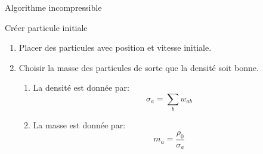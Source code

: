  \begin{frame}[<*>][shrink]{Algorithme incompressible}
\begin{block}{Créer particule initiale}
	\begin{enumerate}
		\item Placer des particules avec position et vitesse initiale.
		\item Choisir la masse des particules de sorte que la densité soit bonne.
		\begin{enumerate}
			\item La densité est donnée par:
			\begin{equation*}
			\sigma_{a}=\sum_{b}w_{ab}
			\end{equation*}
			\item La masse est donnée par:
			\begin{equation*}
			m_a=\frac{\rho_{0}}{\sigma_{a}}
			\end{equation*}
		\end{enumerate}
	\end{enumerate}
\end{block}
\end{frame}

